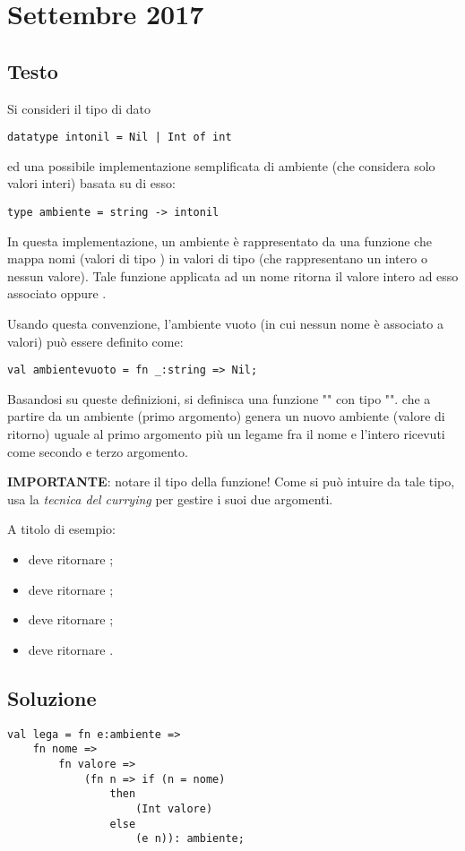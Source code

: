 \section{Settembre 2017}

\subsection{Testo}

Si consideri il tipo di dato

\begin{lstlisting}
datatype intonil = Nil | Int of int
\end{lstlisting}

ed una possibile implementazione semplificata di ambiente (che considera solo valori interi) basata su di esso:

\begin{lstlisting}
type ambiente = string -> intonil
\end{lstlisting}

In questa implementazione, un ambiente è rappresentato da una funzione che mappa nomi (valori di tipo ) in valori di tipo  (che rappresentano un intero o nessun valore). Tale funzione applicata ad un nome ritorna il valore intero ad esso associato oppure .

\medskip
Usando questa convenzione, l'ambiente vuoto (in cui nessun nome è associato a valori) può essere definito come:

\begin{lstlisting}
val ambientevuoto = fn _:string => Nil;
\end{lstlisting}

Basandosi su queste definizioni, si definisca una funzione "" con tipo "". che a partire da un ambiente (primo argomento) genera un nuovo ambiente (valore di ritorno) uguale al primo argomento più un legame fra il nome e l'intero ricevuti come secondo e terzo argomento.

\medskip
\textbf{IMPORTANTE}: notare il tipo della funzione! Come si può intuire da tale tipo, usa la \emph{tecnica del currying} per gestire i suoi due argomenti.

\medskip
A titolo di esempio:

\begin{itemize}
  \item {} deve ritornare ;
  \item {} deve ritornare ;
  \item {} deve ritornare ;
  \item {} deve ritornare .
\end{itemize}

\subsection{Soluzione}

\begin{lstlisting}
val lega = fn e:ambiente =>
	fn nome =>
		fn valore =>
			(fn n => if (n = nome)
			    then
					(Int valore)
			    else
					(e n)): ambiente;
\end{lstlisting}

